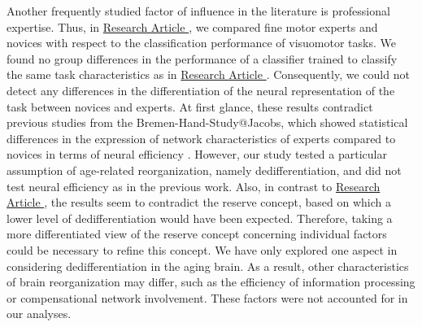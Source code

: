 Another frequently studied factor of influence in the literature is professional expertise. Thus, in \hyperref[results:paperIV]{Research Article }, we compared fine motor experts and novices with respect to the classification performance of visuomotor tasks. We found no group differences in the performance of a classifier trained to classify the same task characteristics as in \hyperref[results:paperI]{Research Article }. Consequently, we could not detect any differences in the differentiation of the neural representation of the task between novices and experts. At first glance, these results contradict previous studies from the Bremen-Hand-Study@Jacobs, which showed statistical differences in the expression of network characteristics of experts compared to novices in terms of neural efficiency \cite{Goelz2018, Vieluf2018}. However, our study tested a particular assumption of age-related reorganization, namely dedifferentiation, and did not test neural efficiency as in the previous work. Also, in contrast to \hyperref[results:paperIII]{Research Article }, the results seem to contradict the reserve concept, based on which a lower level of dedifferentiation would have been expected. Therefore, taking a more differentiated view of the reserve concept concerning individual factors could be necessary to refine this concept. We have only explored one aspect in considering dedifferentiation in the aging brain. As a result, other characteristics of brain reorganization may differ, such as the efficiency of information processing or compensational network involvement. These factors were not accounted for in our analyses.

